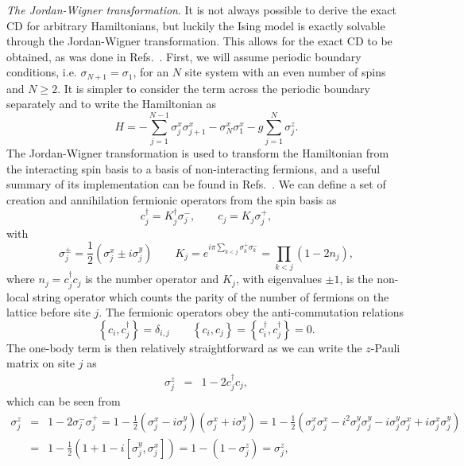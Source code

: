 \emph{The Jordan-Wigner transformation}. It is not always possible to derive the exact CD for arbitrary Hamiltonians, but luckily the Ising model is exactly solvable through the Jordan-Wigner transformation. This allows for the exact CD to be obtained, as was done in Refs.~\cite{delCampo2012Assisted,damskiJPA2013,damskiJSM2014}. First, we will assume periodic boundary conditions, i.e. $\sigma_{N+1}=\sigma_1$, for an $N$ site system with an even number of spins and $N\geq2$. It is simpler to consider the term across the periodic boundary separately and to write the Hamiltonian as
\begin{equation}\label{eq:Isingper}
H = - \sum_{j=1}^{N-1} \sigma^x_j \sigma^x_{j+1} - \sigma^x_N \sigma^x_{1} - g  \sum_{j=1}^{N} \sigma_j^z.
\end{equation}
The Jordan-Wigner transformation is used to transform the Hamiltonian from the interacting spin basis to a basis of non-interacting fermions, and a useful summary of its implementation can be found in Refs.~\cite{mbengArXiv2020,damskiJPA2013}. We can define a set of creation and annihilation fermionic operators from the spin basis as
\begin{equation}\label{eq:JW}
c_j^\dagger = K_j^\dagger \sigma_j^-, \qquad
c_j = K_j \sigma_j^+,
\end{equation}
with
\begin{equation}
\sigma_j^\pm = \frac{1}{2}\left(\sigma_j^x \pm i \sigma_j^y\right) \qquad K_j = e^{i\pi \sum_{k<j} \sigma_k^+ \sigma_k^-} = \prod_{k<j} \left( 1 - 2 n_j \right),
\end{equation}
where $n_j=c_j^\dagger c_j$ is the number operator and $K_j$, with eigenvalues $\pm 1$, is the non-local string operator which counts the parity of the number of fermions on the lattice before site $j$. The fermionic operators obey the anti-commutation relations
\begin{equation}\label{eq:anticomm}
\left\{ c_i, c_j^\dagger \right\} = \delta_{i,j} \qquad \left\{ c_i, c_j \right\} =  \left\{ c_i^\dagger, c_j^\dagger \right\} = 0.
\end{equation}
The one-body term is then relatively straightforward as we can write the $z$-Pauli matrix on site $j$ as 
\begin{eqnarray}
\sigma_j^z & = & 1 - 2 c_j^\dagger c_j, 
\end{eqnarray}
which can be seen from
\begin{eqnarray}
\sigma_j^z & = & 1 - 2 \sigma_j^- \sigma_j^+ = 1 - \frac{1}{2}\left( \sigma_j^x - i \sigma_j^y \right) \left( \sigma_j^x + i \sigma_j^y \right) = 1 - \frac{1}{2}\left( \sigma_j^x \sigma_j^x - i^2 \sigma_j^y \sigma_j^y - i \sigma_j^y \sigma_j^x + i \sigma_j^x \sigma_j^y \right) \\ \nonumber 
& = & 1 - \frac{1}{2}\left( 1 + 1 - i [\sigma_j^y, \sigma_j^x] \right) = 1 - \left( 1 - \sigma_j^z \right) =  \sigma_j^z , 
\end{eqnarray}
